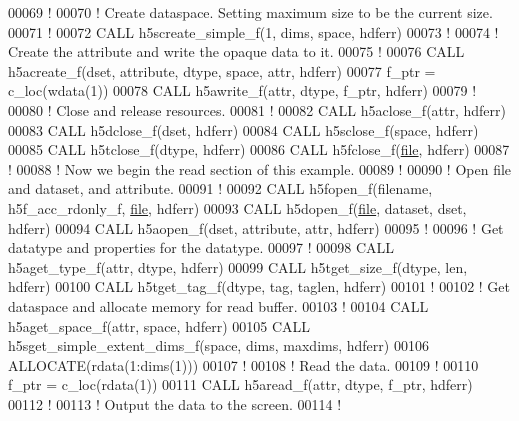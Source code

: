 \begin{DoxyCode}
00069   \textcolor{comment}{!}
00070   \textcolor{comment}{! Create dataspace.  Setting maximum size to be the current size.}
00071   \textcolor{comment}{!}
00072   \textcolor{keyword}{CALL }h5screate\_simple\_f(1, dims, space, hdferr)
00073   \textcolor{comment}{!}
00074   \textcolor{comment}{! Create the attribute and write the opaque data to it.}
00075   \textcolor{comment}{!}
00076   \textcolor{keyword}{CALL }h5acreate\_f(dset, attribute, dtype, space, attr, hdferr)
00077   f\_ptr = c\_loc(wdata(1))
00078   \textcolor{keyword}{CALL }h5awrite\_f(attr, dtype, f\_ptr, hdferr)
00079   \textcolor{comment}{!}
00080   \textcolor{comment}{! Close and release resources.}
00081   \textcolor{comment}{!}
00082   \textcolor{keyword}{CALL }h5aclose\_f(attr, hdferr)
00083   \textcolor{keyword}{CALL }h5dclose\_f(dset, hdferr)
00084   \textcolor{keyword}{CALL }h5sclose\_f(space, hdferr)
00085   \textcolor{keyword}{CALL }h5tclose\_f(dtype, hdferr)
00086   \textcolor{keyword}{CALL }h5fclose\_f(\hyperlink{structfile}{file}, hdferr)
00087   \textcolor{comment}{!}
00088   \textcolor{comment}{! Now we begin the read section of this example.}
00089   \textcolor{comment}{!}
00090   \textcolor{comment}{! Open file and dataset, and attribute.}
00091   \textcolor{comment}{!}
00092   \textcolor{keyword}{CALL }h5fopen\_f(filename, h5f\_acc\_rdonly\_f, \hyperlink{structfile}{file}, hdferr)
00093   \textcolor{keyword}{CALL }h5dopen\_f(\hyperlink{structfile}{file}, dataset, dset, hdferr)
00094   \textcolor{keyword}{CALL }h5aopen\_f(dset, attribute, attr, hdferr)
00095   \textcolor{comment}{!    }
00096   \textcolor{comment}{! Get datatype and properties for the datatype.}
00097   \textcolor{comment}{!}
00098   \textcolor{keyword}{CALL }h5aget\_type\_f(attr, dtype, hdferr)
00099   \textcolor{keyword}{CALL }h5tget\_size\_f(dtype, len, hdferr)
00100   \textcolor{keyword}{CALL }h5tget\_tag\_f(dtype, tag, taglen, hdferr)
00101   \textcolor{comment}{!}
00102   \textcolor{comment}{! Get dataspace and allocate memory for read buffer.}
00103   \textcolor{comment}{!}
00104   \textcolor{keyword}{CALL }h5aget\_space\_f(attr, space, hdferr)
00105   \textcolor{keyword}{CALL }h5sget\_simple\_extent\_dims\_f(space, dims, maxdims, hdferr)
00106   \textcolor{keyword}{ALLOCATE}(rdata(1:dims(1)))
00107   \textcolor{comment}{!}
00108   \textcolor{comment}{! Read the data.}
00109   \textcolor{comment}{!}
00110   f\_ptr = c\_loc(rdata(1))
00111   \textcolor{keyword}{CALL }h5aread\_f(attr, dtype, f\_ptr, hdferr)
00112   \textcolor{comment}{!}
00113   \textcolor{comment}{! Output the data to the screen.}
00114   \textcolor{comment}{!}

\end{DoxyCode}
